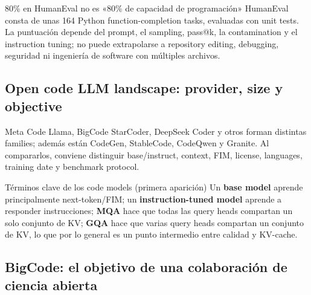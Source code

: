 
\begin{warningbox}{80\% en HumanEval no es «80\% de capacidad de programación»}
HumanEval consta de unas 164 Python function-completion tasks, evaluadas con unit tests. La puntuación depende del prompt, el sampling, pass@k, la contamination y el instruction tuning; no puede extrapolarse a repository editing, debugging, seguridad ni ingeniería de software con múltiples archivos.
\end{warningbox}

\subsection{Open code LLM landscape: provider, size y objective}

Meta Code Llama, BigCode StarCoder, DeepSeek Coder y otros forman distintas families; además están CodeGen, StableCode, CodeQwen y Granite. Al compararlos, conviene distinguir base/instruct, context, FIM, license, languages, training date y benchmark protocol.


\begin{knowledgebox}{Términos clave de los code models (primera aparición)}
Un \textbf{base model} aprende principalmente next-token/FIM; un \textbf{instruction-tuned model} aprende a responder instrucciones; \textbf{MQA} hace que todas las query heads compartan un solo conjunto de KV; \textbf{GQA} hace que varias query heads compartan un conjunto de KV, lo que por lo general es un punto intermedio entre calidad y KV-cache.
\end{knowledgebox}


\subsection{BigCode: el objetivo de una colaboración de ciencia abierta}

